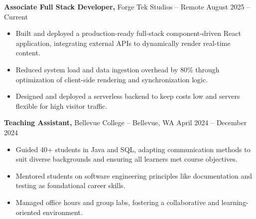 \documentclass[11pt]{article}       %
\begin{document}
\textbf{Associate Full Stack Developer,} {Forge Tek Studios} -- Remote \hfill August 2025 -- Current 
\vspace{-9pt}
\begin{itemize}
  \item Built and deployed a production-ready full-stack component-driven React application, integrating external APIs to dynamically render real-time content.
  \item Reduced system load and data ingestion overhead by 80\% through optimization of client-side rendering and synchronization logic.
  \item Designed and deployed a serverless backend to keep costs low and servers flexible for high visitor traffic.
\end{itemize}

\textbf{Teaching Assistant,} {Bellevue College} -- Bellevue, WA \hfill April 2024 -- December 2024 \\
\vspace{-9pt}
\begin{itemize}
  \item Guided 40+ students in Java and SQL, adapting communication methods to suit diverse backgrounds and ensuring all learners met course objectives.
  \item Mentored students on software engineering principles like documentation and testing as foundational career skills.
  \item Managed office hours and group labs, fostering a collaborative and learning-oriented environment.
\end{itemize}

\end{document}
